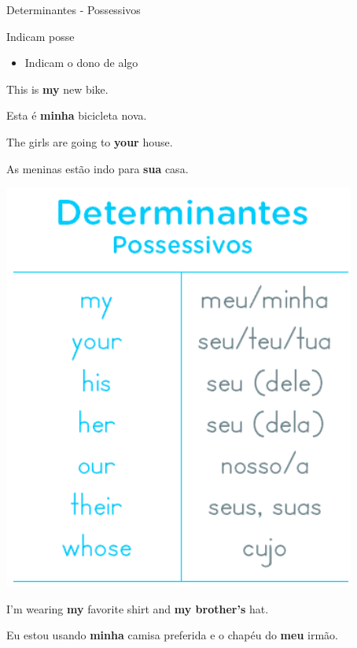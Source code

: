 \documentclass[compress,mathserif,xcolor=table]{beamer}
\begin{document}
\begin{frame}{Determinantes - Possessivos}

\begin{minipage}{.54\textwidth}
Indicam posse
\begin{itemize}
    \item Indicam o dono de algo
\end{itemize}

\vspace{0.5cm}

This is \textbf{my} new bike.

Esta é \textbf{minha} bicicleta nova.

\vspace{0.5cm}

The girls are going to \textbf{your} house.

As meninas estão indo para \textbf{sua} casa.

\end{minipage}
\begin{minipage}{.44\textwidth}
\includegraphics[width=\linewidth]{images/determinantes_possessivos.png}
\end{minipage}

\vspace{0.5cm}

I'm wearing \textbf{my} favorite shirt and \textbf{my brother’s} hat.

Eu estou usando \textbf{minha} camisa preferida e o chapéu do \textbf{meu} irmão.

\end{frame}
\end{document}
